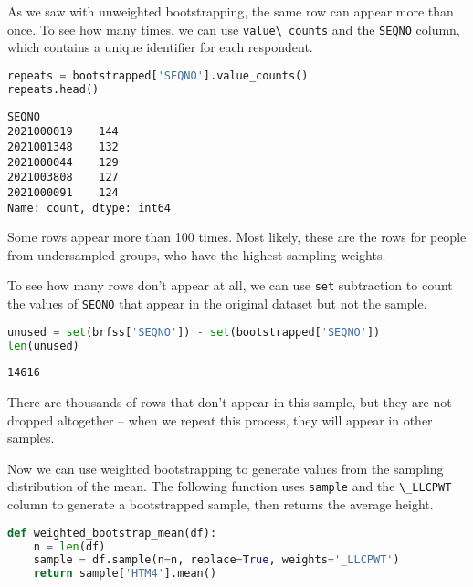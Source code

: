 As we saw with unweighted bootstrapping, the same row can appear more
than once.
To see how many times, we can use
\passthrough{\lstinline!value\_counts!} and the
\passthrough{\lstinline!SEQNO!} column, which contains a unique
identifier for each respondent.

\pagebreak

\begin{lstlisting}[language=Python,style=source]
repeats = bootstrapped['SEQNO'].value_counts()
repeats.head()
\end{lstlisting}

\begin{lstlisting}[style=output]
SEQNO
2021000019    144
2021001348    132
2021000044    129
2021003808    127
2021000091    124
Name: count, dtype: int64
\end{lstlisting}

Some rows appear more than 100 times. Most likely, these are the rows
for people from undersampled groups, who have the highest sampling
weights.

To see how many rows don't appear at all, we can use
\passthrough{\lstinline!set!} subtraction to count the values of
\passthrough{\lstinline!SEQNO!} that appear in the original dataset but
not the sample.

\begin{lstlisting}[language=Python,style=source]
unused = set(brfss['SEQNO']) - set(bootstrapped['SEQNO'])
len(unused)
\end{lstlisting}

\begin{lstlisting}[style=output]
14616
\end{lstlisting}

There are thousands of rows that don't appear in this sample, but they
are not dropped altogether -- when we repeat this process, they will
appear in other samples.

Now we can use weighted bootstrapping to generate values from the
sampling distribution of the mean. The following function uses
\passthrough{\lstinline!sample!} and the
\passthrough{\lstinline!\_LLCPWT!} column to generate a bootstrapped
sample, then returns the average height.

\begin{lstlisting}[language=Python,style=source]
def weighted_bootstrap_mean(df):
    n = len(df)
    sample = df.sample(n=n, replace=True, weights='_LLCPWT')
    return sample['HTM4'].mean()
\end{lstlisting}

